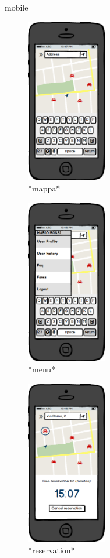 \documentclass[english]{article}
\begin{document}
mobile
\begin{figure}[h]
	\centering
	\includegraphics[width=100pt]{mobile/localization.png}
	\caption{*mappa*}
\end{figure}
\begin{figure}
	\centering		
	\includegraphics[width=100pt]{mobile/MenuSX.png}
	\caption{*menu*}
\end{figure}
\begin{figure}
	\centering
	\includegraphics[width=100pt]{mobile/FreeReservation.png}
	\caption{*reservation*}
\end{figure}
\end{document}
